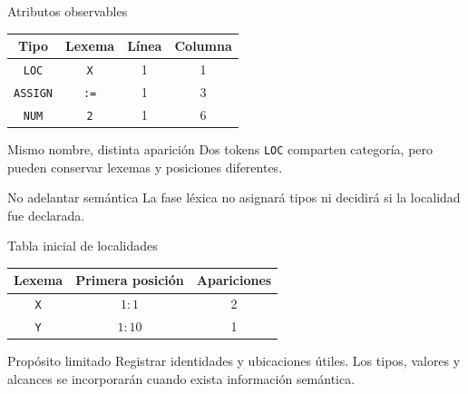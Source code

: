 \documentclass[11pt,spanish]{beamer}
\begin{document}
\begin{frame}{Atributos observables}
\vfill

\begin{center}
\small
\renewcommand{\arraystretch}{1.3}
\begin{tabular}{|c|c|c|c|}
\hline
\textbf{Tipo} & \textbf{Lexema} & \textbf{Línea} & \textbf{Columna} \\
\hline
\texttt{LOC} & \texttt{X} & 1 & 1 \\
\hline
\texttt{ASSIGN} & \texttt{:=} & 1 & 3 \\
\hline
\texttt{NUM} & \texttt{2} & 1 & 6 \\
\hline
\end{tabular}
\end{center}

\bigskip

\begin{block}{Mismo nombre, distinta aparición}
Dos tokens \texttt{LOC} comparten categoría, pero pueden conservar lexemas y posiciones diferentes.
\end{block}

\begin{alertblock}{No adelantar semántica}
La fase léxica no asignará tipos ni decidirá si la localidad fue declarada.
\end{alertblock}

\vfill
\end{frame}

\begin{frame}{Tabla inicial de localidades}
\vfill

\begin{center}
\small
\renewcommand{\arraystretch}{1.3}
\begin{tabular}{|c|c|c|}
\hline
\textbf{Lexema} & \textbf{Primera posición} & \textbf{Apariciones} \\
\hline
\texttt{X} & \(1:1\) & 2 \\
\hline
\texttt{Y} & \(1:10\) & 1 \\
\hline
\end{tabular}
\end{center}

\bigskip

\begin{block}{Propósito limitado}
Registrar identidades y ubicaciones útiles. Los tipos, valores y alcances se incorporarán cuando exista información semántica.
\end{block}

\vfill
\end{frame}
\end{document}
